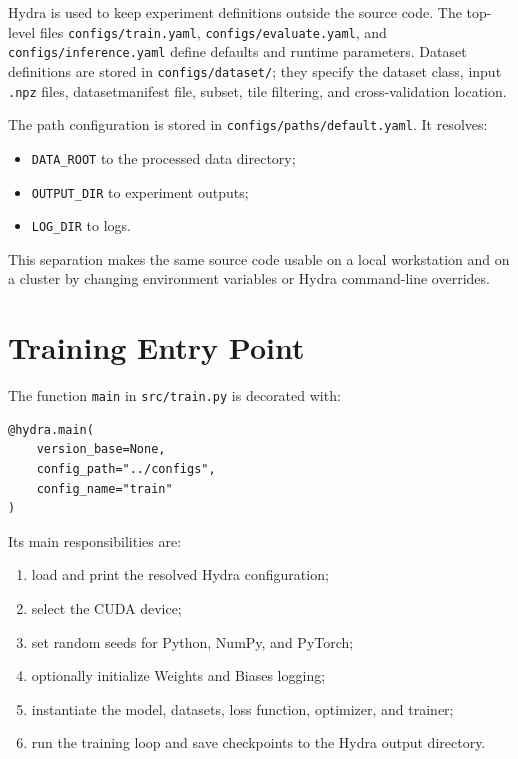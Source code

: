 \begin{sloppypar}
Hydra is used to keep experiment definitions outside the source code. The top-level files \texttt{configs/train.yaml}, \texttt{configs/evaluate.yaml}, and \texttt{configs/inference.yaml} define defaults and runtime parameters. Dataset definitions are stored in \texttt{configs/dataset/}; they specify the dataset class, input \texttt{.npz} files, \gls{datasetmanifest} file, subset, tile filtering, and cross-validation location.

The path configuration is stored in \texttt{configs/paths/default.yaml}. It resolves:

\begin{itemize}
    \item \texttt{DATA\_ROOT} to the processed data directory;
    \item \texttt{OUTPUT\_DIR} to experiment outputs;
    \item \texttt{LOG\_DIR} to logs.
\end{itemize}

This separation makes the same source code usable on a local workstation and on a cluster by changing environment variables or Hydra command-line overrides.

\section{Training Entry Point}

The function \texttt{main} in \texttt{src/train.py} is decorated with:

\begin{verbatim}
@hydra.main(
    version_base=None,
    config_path="../configs",
    config_name="train"
)
\end{verbatim}

Its main responsibilities are:

\begin{enumerate}
    \item load and print the resolved Hydra configuration;
    \item select the CUDA device;
    \item set random seeds for Python, NumPy, and PyTorch;
    \item optionally initialize Weights and Biases logging;
    \item instantiate the model, datasets, loss function, optimizer, and trainer;
    \item run the training loop and save checkpoints to the Hydra output directory.
\end{enumerate}


\end{sloppypar}
